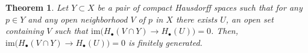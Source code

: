 \documentclass{article}
\newtheorem{theorem}{Theorem}
\newcommand{\im}{\mathrm{im}}
\begin{document}
	\begin{theorem}
		Let $Y \subset X$ be a pair of compact Hausdorff spaces such that for any $p \in Y$ and any open neighborhood $V$ of $p$ in $X$ there exists $U$, an open set containing $V$ such that $\im \big(H_\bullet(V \cap Y) \to H_\bullet(U)\big) = 0$. Then, $\im \big(H_\bullet(V \cap Y) \to H_\bullet(U)\big) = 0$ is finitely generated.
	\end{theorem}	
\end{document}

